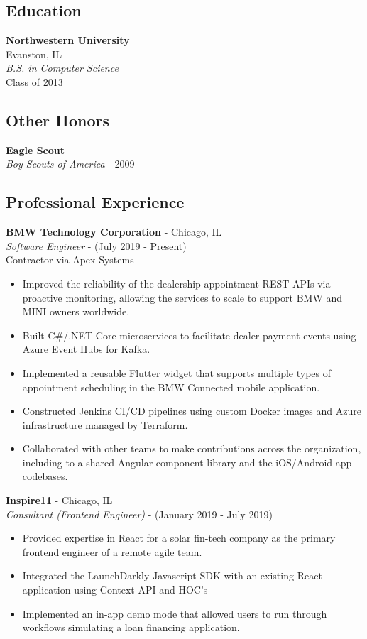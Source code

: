 \documentclass[11pt]{article}
\begin{document}
\begin{paracol}{2}
\subsection*{Education}
\textbf{Northwestern University} \\ 
Evanston, IL \\
\textit{B.S. in Computer Science}  \\
{\footnotesize{Class of 2013}}

\subsection*{Other Honors}
\textbf{Eagle Scout} \\
\textit{Boy Scouts of America} - {\footnotesize{2009}}

\switchcolumn 

\subsection*{Professional Experience} 

\textbf{BMW Technology Corporation} - Chicago, IL \\
\textit{Software Engineer} - {\footnotesize{(July 2019 - Present)}} \\
{\footnotesize{Contractor via Apex Systems}} 
\begin{itemize}
    \item Improved the reliability of the dealership appointment REST APIs via proactive monitoring, allowing the services to scale to support BMW and MINI owners worldwide.
    \item Built C\#/.NET Core microservices to facilitate dealer payment events using Azure Event Hubs for Kafka.
    \item Implemented a reusable Flutter widget that supports multiple types of appointment scheduling in the BMW Connected mobile application.
    \item Constructed Jenkins CI/CD pipelines using custom Docker images and Azure infrastructure managed by Terraform.
    \item Collaborated with other teams to make contributions across the organization, including to a shared Angular component library and the iOS/Android app codebases.
\end{itemize} 


\noindent \textbf{Inspire11} - Chicago, IL \\
\textit{Consultant (Frontend Engineer)} - {\footnotesize{(January 2019 - July 2019)}} 
\begin{itemize}
    \item Provided expertise in React for a solar fin-tech company as the primary frontend engineer of a remote agile team.
    \item Integrated the LaunchDarkly Javascript SDK with an existing React application using Context API and HOC's
    \item Implemented an in-app demo mode that allowed users to run through workflows simulating a loan financing application.
\end{itemize} 


\end{paracol}
\end{document}
